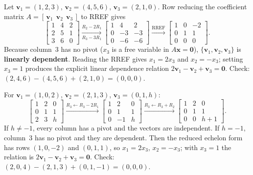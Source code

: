 \documentclass[10pt]{scrartcl}
\newcommand{\vv}[1]{\mathbf{#1}}
\begin{document}
\begin{example*}
Let $\vv v_1=(1,2,3)$, $\vv v_2=(4,5,6)$, $\vv v_3=(2,1,0)$. Row reducing the coefficient matrix $A=[\,\vv v_1\ \ \vv v_2\ \ \vv v_3\,]$ to RREF gives
\[
  \begin{bmatrix} 1 & 4 & 2 \\ 2 & 5 & 1 \\ 3 & 6 & 0 \end{bmatrix}
  \xrightarrow[R_3-3R_1]{R_2-2R_1}
  \begin{bmatrix} 1 & 4 & 2 \\ 0 & -3 & -3 \\ 0 & -6 & -6 \end{bmatrix}
  \xrightarrow{\text{RREF}}
  \begin{bmatrix} 1 & 0 & -2 \\ 0 & 1 & 1 \\ 0 & 0 & 0 \end{bmatrix}.
\]
Because column~3 has no pivot ($x_3$ is a free variable in $A\vv x=\vv 0$), $\{\vv v_1,\vv v_2,\vv v_3\}$ is \textbf{linearly dependent}. Reading the RREF gives $x_1=2x_3$ and $x_2=-x_3$; setting $x_3=1$ produces the explicit linear dependence relation $2\vv v_1-\vv v_2+\vv v_3=\vv 0$. Check: $(2,4,6)-(4,5,6)+(2,1,0)=(0,0,0)$.
\end{example*}

\begin{example*}
For $\vv v_1=(1,0,2)$, $\vv v_2=(2,1,3)$, $\vv v_3=(0,1,h)$:
\[
  \begin{bmatrix}1&2&0\\0&1&1\\2&3&h\end{bmatrix}
  \xrightarrow{R_3\leftarrow R_3-2R_1}
  \begin{bmatrix}1&2&0\\0&1&1\\0&-1&h\end{bmatrix}
  \xrightarrow{R_3\leftarrow R_3+R_2}
  \begin{bmatrix}1&2&0\\0&1&1\\0&0&h+1\end{bmatrix}.
\]
If $h\ne-1$, every column has a pivot and the vectors are independent. If $h=-1$, column~3 has no pivot and they are dependent. Then the reduced echelon form has rows $(1,0,-2)$ and $(0,1,1)$, so $x_1=2x_3$, $x_2=-x_3$; with $x_3=1$ the relation is $2\vv v_1-\vv v_2+\vv v_3=\vv 0$. Check: $(2,0,4)-(2,1,3)+(0,1,-1)=(0,0,0)$.
\end{example*}
\end{document}
